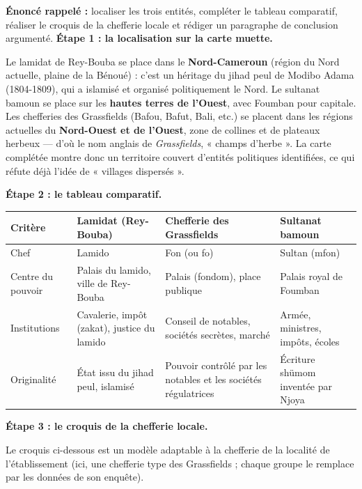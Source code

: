 \documentclass[11pt]{article}
\begin{document}
\begin{exoresolu}
\textbf{Énoncé rappelé :} localiser les trois entités, compléter le tableau comparatif, réaliser le croquis de la chefferie locale et rédiger un paragraphe de conclusion argumenté.
\tcblower
\textbf{Étape 1 : la localisation sur la carte muette.}

Le lamidat de Rey-Bouba se place dans le \textbf{Nord-Cameroun} (région du Nord actuelle, plaine de la Bénoué) : c'est un héritage du jihad peul de Modibo Adama (1804-1809), qui a islamisé et organisé politiquement le Nord. Le sultanat bamoun se place sur les \textbf{hautes terres de l'Ouest}, avec Foumban pour capitale. Les chefferies des Grassfields (Bafou, Bafut, Bali, etc.) se placent dans les régions actuelles du \textbf{Nord-Ouest et de l'Ouest}, zone de collines et de plateaux herbeux — d'où le nom anglais de \emph{Grassfields}, « champs d'herbe ». La carte complétée montre donc un territoire couvert d'entités politiques identifiées, ce qui réfute déjà l'idée de « villages dispersés ».

\textbf{Étape 2 : le tableau comparatif.}

\begin{center}
\begin{tabularx}{\linewidth}{|l|X|X|X|}\hline
\rowcolor{popblueL} \textbf{Critère} & \textbf{Lamidat (Rey-Bouba)} & \textbf{Chefferie des Grassfields} & \textbf{Sultanat bamoun} \\ \hline
Chef & Lamido & Fon (ou fo) & Sultan (mfon) \\ \hline
Centre du pouvoir & Palais du lamido, ville de Rey-Bouba & Palais (fondom), place publique & Palais royal de Foumban \\ \hline
Institutions & Cavalerie, impôt (zakat), justice du lamido & Conseil de notables, sociétés secrètes, marché & Armée, ministres, impôts, écoles \\ \hline
Originalité & État issu du jihad peul, islamisé & Pouvoir contrôlé par les notables et les sociétés régulatrices & Écriture shümom inventée par Njoya \\ \hline
\end{tabularx}
\end{center}

\textbf{Étape 3 : le croquis de la chefferie locale.}

Le croquis ci-dessous est un modèle adaptable à la chefferie de la localité de l'établissement (ici, une chefferie type des Grassfields ; chaque groupe le remplace par les données de son enquête).


\end{exoresolu}
\end{document}
